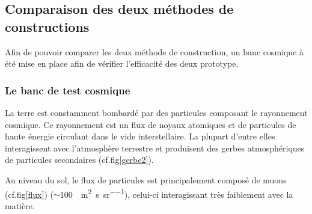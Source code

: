  \subsection{Comparaison des deux méthodes de constructions}
 Afin de pouvoir comparer les deux méthode de construction, un banc cosmique à été mise en place afin de vérifier l'efficacité des deux prototype.
 
 \subsubsection{Le banc de test cosmique}
 La terre est constamment bombardé par des particules composant le rayonnement cosmique. Ce rayonnement est un flux de noyaux atomiques et de particules de haute énergie circulant dans le vide interstellaire. La plupart d'entre elles interagissent avec l'atmosphère terrestre et produisent des gerbes atmosphériques de particules secondaires (cf.fig\ref{gerbe2}).
 
 Au niveau du sol, le flux de particules est principalement composé de muons (cf.fig\ref{flux}) ($\sim$\SI{100}{\per\square\meter\per\second\per\steradian}), celui-ci interagissant très faiblement avec la matière.
 
